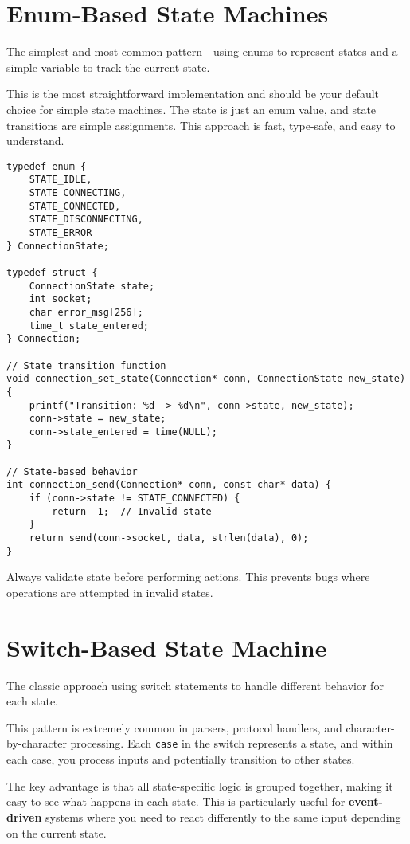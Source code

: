 \section{Enum-Based State Machines}

The simplest and most common pattern---using enums to represent states and a simple variable to track the current state.

This is the most straightforward implementation and should be your default choice for simple state machines. The state is just an enum value, and state transitions are simple assignments. This approach is fast, type-safe, and easy to understand.

\begin{lstlisting}
typedef enum {
    STATE_IDLE,
    STATE_CONNECTING,
    STATE_CONNECTED,
    STATE_DISCONNECTING,
    STATE_ERROR
} ConnectionState;

typedef struct {
    ConnectionState state;
    int socket;
    char error_msg[256];
    time_t state_entered;
} Connection;

// State transition function
void connection_set_state(Connection* conn, ConnectionState new_state) {
    printf("Transition: %d -> %d\n", conn->state, new_state);
    conn->state = new_state;
    conn->state_entered = time(NULL);
}

// State-based behavior
int connection_send(Connection* conn, const char* data) {
    if (conn->state != STATE_CONNECTED) {
        return -1;  // Invalid state
    }
    return send(conn->socket, data, strlen(data), 0);
}
\end{lstlisting}

\begin{tipbox}
Always validate state before performing actions. This prevents bugs where operations are attempted in invalid states.
\end{tipbox}

\section{Switch-Based State Machine}

The classic approach using switch statements to handle different behavior for each state.

This pattern is extremely common in parsers, protocol handlers, and character-by-character processing. Each \texttt{case} in the switch represents a state, and within each case, you process inputs and potentially transition to other states.

The key advantage is that all state-specific logic is grouped together, making it easy to see what happens in each state. This is particularly useful for \textbf{event-driven} systems where you need to react differently to the same input depending on the current state.

